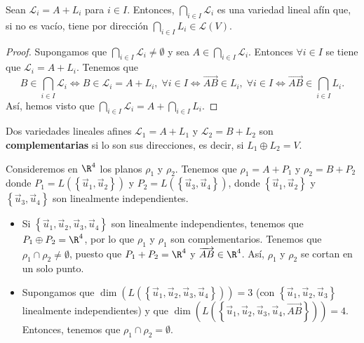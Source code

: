 \begin{fprop}[]
\normalfont Sean $\displaystyle \mathcal{L}_{i} = A + L_{i} $ para $\displaystyle i \in I $. Entonces, $\displaystyle \bigcap_{i\in I}\mathcal{L}_{i} $ es una variedad lineal afín que, si no es vacío, tiene por dirección $\displaystyle \bigcap_{i \in I}L_{i} \in \mathcal{L}\left(V\right) $.
\end{fprop}
\begin{proof}
Supongamos que $\displaystyle \bigcap_{i \in I}\mathcal{L}_{i} \neq \emptyset $ y sea $\displaystyle A \in \bigcap_{i \in I}\mathcal{L}_{i} $. Entonces $\displaystyle \forall i \in I $ se tiene que $\displaystyle \mathcal{L}_{i} = A + L_{i} $. Tenemos que 
\[ B \in \bigcap_{i \in I}\mathcal{L}_{i} \iff B \in \mathcal{L}_{i} = A + L_{i}, \; \forall i \in I \iff \overrightarrow{AB} \in L_{i}, \; \forall i \in I \iff \overrightarrow{AB} \in \bigcap_{i \in I}L_{i}.\]
Así, hemos visto que $\displaystyle \bigcap_{i \in I}\mathcal{L}_{i} = A+ \bigcap_{i \in I}L_{i} $.
\end{proof}
\begin{fdefinition}[]
\normalfont Dos variedades lineales afines $\displaystyle \mathcal{L}_{1} = A + L_{1} $ y $\displaystyle \mathcal{L}_{2} = B + L_{2} $ son \textbf{complementarias} si lo son sus direcciones, es decir, si $\displaystyle L_{1} \oplus L_{2} = V $.
\end{fdefinition}
\begin{eg}
	\normalfont Consideremos en $\displaystyle \R^{4} $ los planos $\displaystyle \rho_{1} $ y $\displaystyle \rho_{2} $. Tenemos que $\displaystyle \rho_{1} = A + P_{1} $ y $\displaystyle \rho_{2} = B + P_{2} $ donde $\displaystyle P_{1} = L\left( \left\{ \vec{u}_{1}, \vec{u}_{2}\right\} \right) $ y $\displaystyle P_{2} = L\left( \left\{ \vec{u}_{3}, \vec{u}_{4}\right\} \right) $, donde $\displaystyle \left\{ \vec{u}_{1}, \vec{u}_{2}\right\}  $ y $\displaystyle \left\{ \vec{u}_{3}, \vec{u}_{4}\right\}  $ son linealmente independientes. 
	\begin{itemize}
		\item Si $\displaystyle \left\{ \vec{u}_{1}, \vec{u}_{2}, \vec{u}_{3}, \vec{u}_{4}\right\}  $ son linealmente independientes, tenemos que $\displaystyle P_{1} \oplus P_{2} = \R^{4} $, por lo que $\displaystyle \rho_{1}$ y $\displaystyle \rho_{1}$ son complementarios. Tenemos que $\displaystyle \rho_{1} \cap \rho_{2} \neq \emptyset $, puesto que $\displaystyle P_{1} + P_{2} = \R^{4}$ y $\displaystyle \overrightarrow{AB} \in \R^{4} $. Así, $\displaystyle \rho_{1} $ y $\displaystyle \rho_{2} $ se cortan en un solo punto.
		\item Supongamos que $\displaystyle \dim\left(L\left( \left\{ \vec{u}_{1}, \vec{u}_{2}, \vec{u}_{3}, \vec{u}_{4}\right\} \right)\right) = 3$ (con $\displaystyle \left\{ \vec{u}_{1}, \vec{u}_{2}, \vec{u}_{3}\right\}  $ linealmente independientes) y que $\displaystyle \dim\left(L\left( \left\{ \vec{u}_{1}, \vec{u}_{2}, \vec{u}_{3},\vec{u}_{4}, \overrightarrow{AB}\right\} \right)\right)=4 $. Entonces, tenemos que $\displaystyle \rho_{1} \cap \rho_{2} = \emptyset $.
	\end{itemize}
\end{eg}
